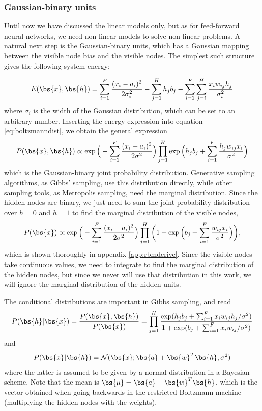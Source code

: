 \subsubsection{Gaussian-binary units}
Until now we have discussed the linear models only, but as for feed-forward neural networks, we need non-linear models to solve non-linear problems. A natural next step is the Gaussian-binary units, which has a Gaussian mapping between the visible node bias and the visible nodes. The simplest such structure gives the following system energy:

\begin{equation}
E(\bs{x},\bs{h})= \sum_{i=1}^F\frac{(x_i-a_i)^2}{2\sigma_i^2} - \sum_{j=1}^Hh_jb_j-\sum_{i=1}^F\sum_{j=i}^H \frac{x_iw_{ij}h_j}{\sigma_i^2} 
\label{eq:gaussianbinary}
\end{equation}
where $\sigma_i$ is the width of the Gaussian distribution, which can be set to an arbitrary number. Inserting the energy expression into equation \eqref{eq:boltzmanndist}, we obtain the general expression
\begin{equation}
P(\bs{x},\bs{h})\propto\exp\Big(-\sum_{i=1}^F\frac{(x_i-a_i)^2}{2\sigma^2}\Big)\prod_{j=1}^H\exp\Big(h_jb_j+\sum_{i=1}^F\frac{h_jw_{ij}x_i}{\sigma^2}\Big)
\label{eq:RBMWF1}
\end{equation}
which is the Gaussian-binary joint probability distribution. Generative sampling algorithms, as Gibbs' sampling, use this distribution directly, while other sampling tools, as Metropolis sampling, need the marginal distribution. Since the hidden nodes are binary, we just need to sum the joint probability distribution over $h=0$ and $h=1$ to find the marginal distribution of the visible nodes,
\begin{equation}
P(\bs{x})\propto\exp\Big(-\sum_{i=1}^F\frac{(x_i-a_i)^2}{2\sigma^2}\Big)\prod_{j=1}^H\bigg(1+\exp\Big(b_j+\sum_{i=1}^F\frac{w_{ij}x_i}{\sigma^2}\Big)\bigg),
\label{eq:RBMWF2}
\end{equation}
which is shown thoroughly in appendix \ref{app:rbmderive}. Since the visible nodes take continuous values, we need to integrate to find the marginal distribution of the hidden nodes, but since we never will use that distribution in this work, we will ignore the marginal distribution of the hidden units.

The conditional distributions are important in Gibbs sampling, and read
\begin{equation}
P(\bs{h}|\bs{x})=\frac{P(\bs{x},\bs{h})}{P(\bs{x})}=\prod_{j=1}^H\frac{\exp(h_jb_j+\sum_{i=1}^Fx_iw_{ij}h_j/\sigma^2)}{1+\exp(b_j+\sum_{i=1}^Fx_iw_{ij}/\sigma^2)}
\end{equation}
and
\begin{equation}
P(\bs{x}|\bs{h})=\mathcal{N}(\bs{x};\bs{a}+\bs{w}^T\bs{h},\sigma^2)
\label{eq:normal}
\end{equation}
where the latter is assumed to be given by a normal distribution in a Bayesian scheme. Note that the mean is $\bs{\mu}=\bs{a}+\bs{w}^T\bs{h}$, which is the vector obtained when going backwards in the restricted Boltzmann machine (multiplying the hidden nodes with the weights).


